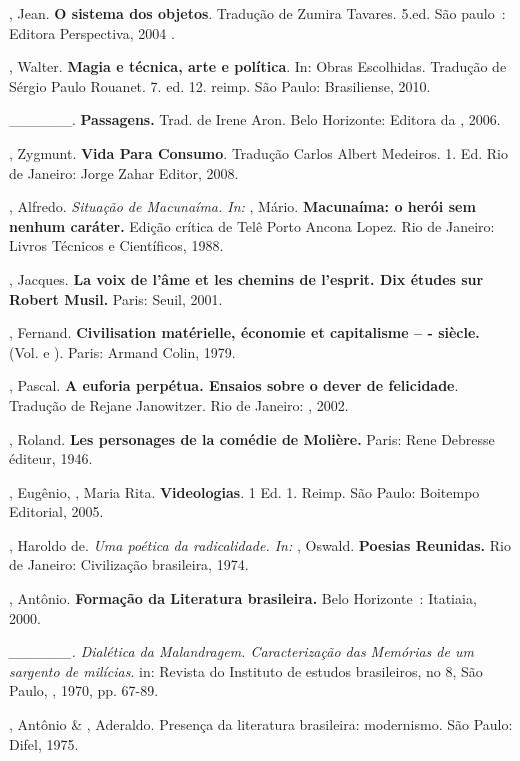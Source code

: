 \begin{Parskip}
, Jean. \textbf{O sistema dos objetos}. Tradução de
Zumira Tavares. 5.ed. São paulo~: Editora Perspectiva, 2004 .

, Walter. \textbf{Magia e técnica, arte e política}. In: Obras
Escolhidas. Tradução de Sérgio Paulo Rouanet. 7. ed. 12. reimp. São
Paulo: Brasiliense, 2010.

\_\_\_\_\_\_. \textbf{Passagens.} Trad. de Irene Aron. Belo Horizonte:
Editora da , 2006.

, Zygmunt. \textbf{Vida Para Consumo}. Tradução Carlos Albert
Medeiros. 1. Ed. Rio de Janeiro: Jorge Zahar Editor, 2008.

, Alfredo. \emph{Situação de Macunaíma. In:} , Mário.
\textbf{Macunaíma: o herói sem nenhum caráter.} Edição crítica de Telê
Porto Ancona Lopez. Rio de Janeiro: Livros Técnicos e Científicos, 1988.

, Jacques. \textbf{La voix de l'âme et les chemins de
l'esprit. Dix études sur Robert Musil.} Paris: Seuil, 2001.

, Fernand. \textbf{Civilisation matérielle, économie et
capitalisme -- - siècle.} (Vol.  e ). Paris: Armand Colin,
1979.

, Pascal. \textbf{A euforia perpétua. Ensaios sobre o dever de
felicidade}. Tradução de Rejane Janowitzer. Rio de Janeiro:
, 2002.

, Roland. \textbf{Les personages de la comédie de Molière.}
Paris: Rene Debresse éditeur, 1946.

, Eugênio, , Maria Rita. \textbf{Videologias}. 1 Ed. 1.
Reimp. São Paulo: Boitempo Editorial, 2005.

, Haroldo de. \emph{Uma poética da radicalidade. In:} ,
Oswald. \textbf{Poesias Reunidas.} Rio de Janeiro: Civilização
brasileira, 1974.

, Antônio. \textbf{Formação da Literatura brasileira.} Belo
Horizonte~: Itatiaia, 2000.

\emph{\_\_\_\_\_\_. Dialética da Malandragem. Caracterização das
Memórias de um sargento de milícias}. in: Revista do Instituto de
estudos brasileiros, no 8, São Paulo, , 1970, pp. 67-89.

, Antônio \& , Aderaldo. Presença da literatura
brasileira: modernismo. São Paulo: Difel, 1975.


\end{Parskip}
